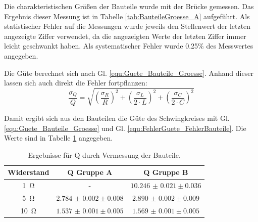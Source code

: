 \documentclass[12pt,a4paper]{article}
\begin{document}
Die charakteristischen Größen der Bauteile wurde mit der Brücke gemessen. Das Ergebnis dieser Messung ist in Tabelle \ref{tab:BauteileGroesse_A} aufgeführt.
Als statistischer Fehler auf die Messungen wurde jeweils den Stellenwert der letzten angezeigte Ziffer verwendet, da die angezeigten Werte der letzten Ziffer immer leicht geschwankt haben. Als systematischer Fehler wurde 0.25\% des Messwertes angegeben.

Die Güte berechnet sich nach Gl. \ref{equ:Guete_Bauteile_Groesse}. Anhand dieser lassen sich auch direkt die Fehler fortpflanzen:
\begin{equation}
\dfrac{\sigma _Q}{Q} = \sqrt{\left( \dfrac{\sigma _R}{R} \right)^2 + \left( \dfrac{\sigma _L}{2 \cdot L} \right)^2 + \left( \dfrac{\sigma _C}{2 \cdot C} \right)^2}
\label{equ:FehlerGuete_FehlerBauteile}
\end{equation}

Damit ergibt sich aus den Bauteilen die Güte des Schwingkreises mit Gl. \ref{equ:Guete_Bauteile_Groesse} und Gl. \ref{equ:FehlerGuete_FehlerBauteile}. Die Werte sind in Tabelle  \ref{tab:Serienguete_Var4} angegeben.


\begin{table}
	\centering
	\begin{tabular}{|c|c|c|}
		\hline
		Widerstand & Q Gruppe A & Q Gruppe B \\
		\hline
		\SI{1}{\ohm} & - & $\num{10.246(21)} \pm 0.036$ \\
		\hline
		\SI{5}{\ohm} & $\num{2.784(2)} \pm 0.008$ & $\num{2.890(2)} \pm 0.009$ \\
		\hline
		\SI{10}{\ohm} & $\num{ 1.537(1)} \pm 0.005$ & $\num{1.569(1)} \pm 0.005$ \\
		\hline
	\end{tabular}
	\caption{Ergebnisse für Q durch Vermessung der Bauteile.}
	\label{tab:Serienguete_Var4}
\end{table}
\end{document}
